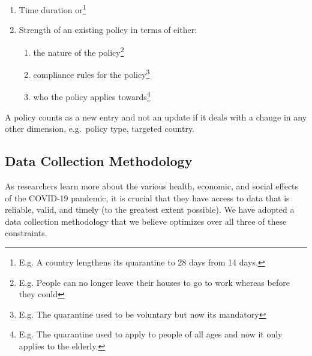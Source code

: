 \documentclass[
]{article}
\providecommand{\tightlist}{%
  \setlength{\itemsep}{0pt}\setlength{\parskip}{0pt}}
\begin{document}
\begin{enumerate}
\def\labelenumi{\arabic{enumi}.}
\tightlist
\item
  Time duration or\footnote{E.g. A country lengthens its quarantine to 28 days from 14 days.}
\item
  Strength of an existing policy in terms of either:

  \begin{enumerate}
  \def\labelenumii{\alph{enumii}.}
  \tightlist
  \item
    the nature of the policy\footnote{E.g. People can no longer leave their houses to go to work whereas before they could}
  \item
    compliance rules for the policy\footnote{E.g. The quarantine used to be voluntary but now its mandatory}
  \item
    who the policy applies towards\footnote{E.g. The quarantine used to apply to people of all ages and now it only applies to the elderly.}
  \end{enumerate}
\end{enumerate}

A policy counts as a new entry and not an update if it deals with a change in any other dimension, e.g.~policy type, targeted country.

\hypertarget{data-collection-methodology}{%
\subsection*{Data Collection Methodology}\label{data-collection-methodology}}

As researchers learn more about the various health, economic, and social effects of the COVID-19 pandemic, it is crucial that they have access to data that is reliable, valid, and timely (to the greatest extent possible). We have adopted a data collection methodology that we believe optimizes over all three of these constraints.
\end{document}
